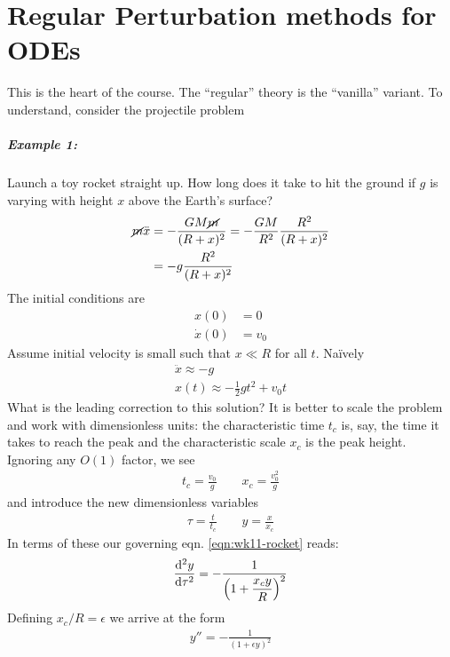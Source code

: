 \chapter[Perturbation for ODE]{Regular Perturbation methods for ODEs}
This is the heart of the course. The ``regular'' theory is the ``vanilla'' variant. To understand, consider the projectile problem

\paragraph{Example 1:} Launch a toy rocket straight up. How long does it take to hit the ground if $g$ is varying with height $x$ above the Earth's surface?
\begin{align}
	\cancel{m} \ddot{x} &= -\frac{GM\cancel{m}}{(R+x)^2} = -\frac{GM}{R^2} \frac{R^2}{(R+x)^2} \nonumber \\
	&= -g \frac{R^2}{(R+x)^2} \label{eqn:wk11-rocket}
\end{align}
The initial conditions are
\begin{align*}
	x(0) &= 0 \\
	\dot{x}(0) &= v_0
\end{align*}
Assume initial velocity is small such that $x \ll R$ for all $t$. Na\"{i}vely
\begin{gather}
	\ddot{x} \approx -g \nonumber \\
	x(t) \approx  -\frac{1}{2}gt^2 + v_0 t \label{eqn:wk11-rocket-approx}
\end{gather}
What is the leading correction to this solution? It is better to scale the problem and work with dimensionless units: the characteristic time $t_c$ is, say, the time it takes to reach the peak and the characteristic scale $x_c$ is the peak height. Ignoring any $O(1)$ factor, we see
\begin{gather*}
	t_c = \frac{v_0}{g} \qquad x_c = \frac{v_0^2}{g}
\end{gather*}
and introduce the new dimensionless variables
\begin{gather*}
	\tau = \frac{t}{t_c} \qquad y = \frac{x}{x_c}
\end{gather*}
In terms of these our governing eqn. \ref{eqn:wk11-rocket} reads:
\begin{gather*}
	\frac{\mathrm{d}^2 y}{\mathrm{d} \tau^2} = - \frac{1}{\left(1 + \dfrac{x_c y}{R}\right)^2}
\end{gather*}
Defining $x_c/R = \epsilon $ we arrive at the form
\begin{gather*}
	y'' = -\frac{1}{(1+\epsilon y)^2}
\end{gather*}
